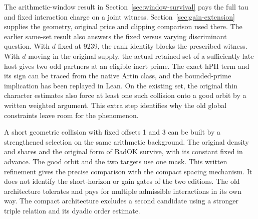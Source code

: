 \documentclass[12pt,letterpaper]{article}
\DeclareRobustCommand{\id}[1]{\mbox{\small\ttfamily #1}}
\begin{document}
The arithmetic-window result in Section~\ref{sec:window-survival} pays the full tau and fixed interaction charge on a joint witness. Section~\ref{sec:gain-extension} supplies the geometry, original price and clipping comparison used there. The earlier same-set result also answers the fixed versus varying discriminant question. With \(d\) fixed at 9239, the rank identity blocks the prescribed witness. With \(d\) moving in the original supply, the actual retained set of a sufficiently late host gives two odd partners at an eligible inert prime. The exact \id{hPH} term and its sign can be traced from the native Artin class, and the bounded-prime implication has been replayed in Lean. On the existing set, the original thin character estimates also force at least one such collision onto a good orbit by a written weighted argument. This extra step identifies why the old global constraints leave room for the phenomenon.

A short geometric collision with fixed offsets 1 and 3 can be built by a strengthened selection on the same arithmetic background. The original density and shares and the original form of \id{BadOK} survive, with its constant fixed in advance. The good orbit and the two targets use one mask. This written refinement gives the precise comparison with the compact spacing mechanism. It does not identify the short-horizon or gain gates of the two editions. The old architecture tolerates and pays for multiple admissible interactions in its own way. The compact architecture excludes a second candidate using a stronger triple relation and its dyadic order estimate.
\end{document}
